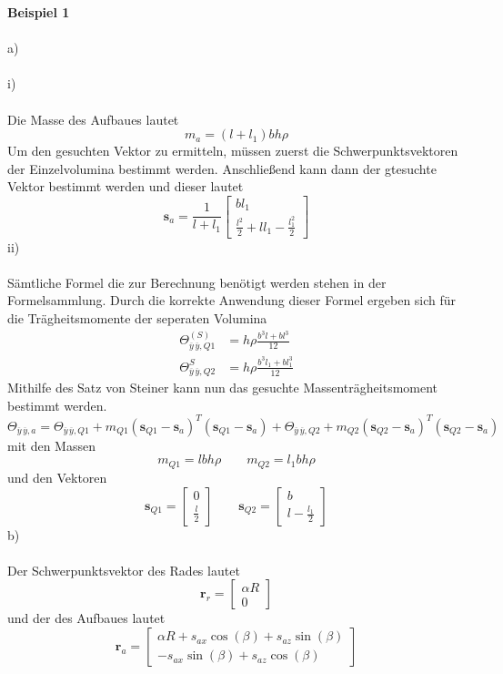 \textbf{Beispiel 1}\\ \\
a)\\ \\
i)\\ \\
Die Masse des Aufbaues lautet
\[
	m_a = (l + l_1)bh\rho
\]
Um den gesuchten Vektor zu ermitteln, müssen zuerst die Schwerpunktsvektoren der Einzelvolumina bestimmt werden. Anschließend kann dann der gtesuchte Vektor bestimmt werden und dieser lautet
\[
	\textbf{s}_a = \frac{1}{l + l_1}\begin{bmatrix}
		bl_1 \\
		\frac{l^2}{2} + ll_1 - \frac{l_1^2}{2}
	\end{bmatrix}
\]
ii)\\ \\
Sämtliche Formel die zur Berechnung benötigt werden stehen in der Formelsammlung. Durch die korrekte Anwendung dieser Formel ergeben sich für die Trägheitsmomente der seperaten Volumina
\begin{align}
	\varTheta_{\overline{y}\,\overline{y},Q1}^{(S)} &= h\rho\frac{b^3l + bl^3}{12} \\
	\varTheta_{\overline{y}\,\overline{y},Q2}^{S} &= h\rho\frac{b^3l_1 + bl_1^3}{12}
\end{align}
Mithilfe des Satz von Steiner kann nun das gesuchte Massenträgheitsmoment bestimmt werden.
\[
	\varTheta_{\overline{y}\,\overline{y},a} = \varTheta_{\overline{y}\,\overline{y},Q1} + m_{Q1}(\textbf{s}_{Q1} - \textbf{s}_a)^T(\textbf{s}_{Q1} - \textbf{s}_a) + \varTheta_{\overline{y}\,\overline{y},Q2} + m_{Q2}(\textbf{s}_{Q2} - \textbf{s}_a)^T(\textbf{s}_{Q2} - \textbf{s}_a) 
\]
mit den Massen
\[
	m_{Q1} = lbh\rho \qquad m_{Q2} = l_1bh\rho
\]
und den Vektoren
\[
	\textbf{s}_{Q1} = \begin{bmatrix}
		0 \\
		\frac{l}{2}
	\end{bmatrix}
	\qquad
	\textbf{s}_{Q2} = \begin{bmatrix}
		b \\
		l - \frac{l_1}{2}
	\end{bmatrix}
\]
b)\\ \\
Der Schwerpunktsvektor des Rades lautet
\[
	\textbf{r}_r = \begin{bmatrix}
		\alpha R \\
		0
	\end{bmatrix}
\]
und der des Aufbaues lautet
\[
	\textbf{r}_a = \begin{bmatrix}
		\alpha R + s_{ax}\cos(\beta) + s_{az}\sin(\beta) \\
		- s_{ax}\sin(\beta) + s_{az}\cos(\beta)
	\end{bmatrix}
\]
